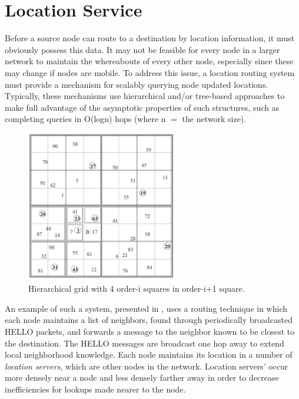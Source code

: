 \documentclass[conference]{IEEEtran}
\newcommand{\colwidth}{2.6in}
\begin{document}

\section{Location Service}

Before a source node can route to a destination by location information, it must obviously possess this data.
It may not be feasible for every node in a larger network to maintain the whereabouts of every other node, especially since these may change if nodes are mobile.
To address this issue, a location routing system must provide a mechanism for scalably querying node updated locations.
Typically, these mechanisms use hierarchical and/or tree-based approaches to make full advantage of the asymptotic properties of such structures, such as completing queries in O(logn) hops (where n $=$ the network size).

\begin{figure}
\label{fig:location-service}
\centering
\includegraphics[width=\colwidth]{../../images/external/location_routing/location_service.pdf}
\caption{Hierarchical grid with 4 order-i squares in order-i+1 square.}
\end{figure}

An example of such a system, presented in \cite{Li:2000:SLS:345910.345931}, uses a routing technique in which each node maintains a list of neighbors, found through periodically broadcasted HELLO packets, and forwards a message to the neighbor known to be closest to the destination.
The HELLO messages are broadcast one hop away to extend local neighborhood knowledge.
Each node maintains its location in a number of \emph{location servers}, which are other nodes in the network.
Location servers' occur more densely near a node and less densely farther away in order to decrease inefficiencies for lookups made nearer to the node.
\end{document}
